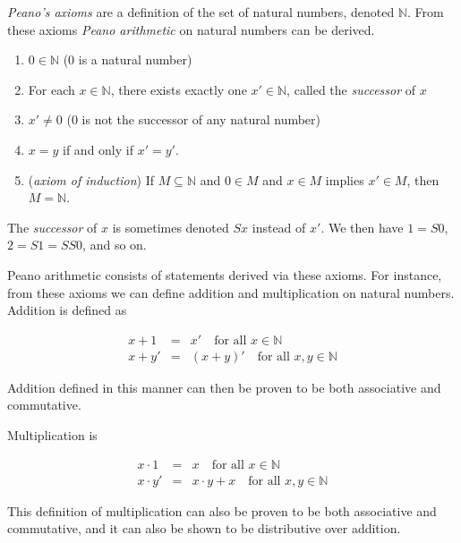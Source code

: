 \documentclass[12pt]{article}
\begin{document}
\emph{Peano's axioms} are a definition of the set of natural numbers, denoted $\mathbb{N}$.  From these axioms \emph{Peano arithmetic} on natural numbers can be derived.

\begin{enumerate}
\item $0\in\mathbb{N}$ (0 is a natural number)
\item For each $x\in\mathbb{N}$, there exists exactly one $x'\in\mathbb{N}$, called the \emph{successor} of $x$
\item $x'\neq 0$ (0 is not the successor of any natural number)
\item $x = y$ if and only if $x' = y'$.
\item (\emph{axiom of induction}) If $M\subseteq\mathbb{N}$ and $0\in M$ and $x\in M$ implies $x'\in M$, then $M = \mathbb{N}$.
\end{enumerate}


The \emph{successor} of $x$ is sometimes denoted $Sx$ instead of $x'$.  We then have $1 = S0$, $2 = S1 = SS0$, and so on.

Peano arithmetic consists of statements derived via these axioms.  For instance, from these axioms we can define addition and multiplication on natural numbers.
Addition is defined as

\begin{eqnarray*}
x+1 & = & x'\quad\text{for all }x\in\mathbb{N} \\
x+y' & = & (x+y)'\quad\text{for all }x,y\in\mathbb{N}
\end{eqnarray*}

Addition defined in this manner can then be proven to be both associative and commutative.

Multiplication is

\begin{eqnarray*}
x\cdot 1 & = & x\quad\text{for all }x\in\mathbb{N} \\
x\cdot y' & = & x\cdot y + x\quad\text{for all }x,y\in\mathbb{N}
\end{eqnarray*}

This definition of multiplication can also be proven to be both associative and commutative, and it can also be shown to be distributive over addition.
\end{document}
